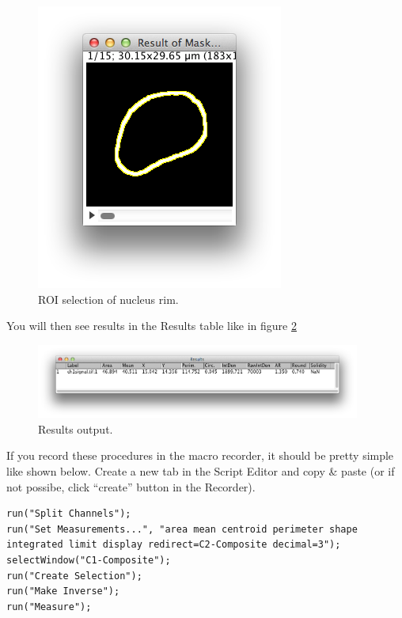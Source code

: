 \begin{figure}[h!]
\begin{center}
\includegraphics[scale=0.8]{fig/ROIselectionNucRim.png}
\caption{ROI selection of nucleus rim. }
\label{fig_RoiNucRim}
\end{center}
\end{figure}

You will then see results in the Results table like in figure \ref{fig_NucRimMeasureResults}

\begin{figure}[h!]
\begin{center}
\includegraphics[width=0.95\textwidth]{fig/MeasurementResults.png}
\caption{Results output.}
\label{fig_NucRimMeasureResults}
\end{center}
\end{figure}

If you record these procedures in the macro recorder, it should be pretty simple like shown below. Create a new tab in the Script Editor and copy \& paste (or if not possibe, click ``create'' button in the Recorder).

\begin{lstlisting}
run("Split Channels");
run("Set Measurements...", "area mean centroid perimeter shape integrated limit display redirect=C2-Composite decimal=3");
selectWindow("C1-Composite");
run("Create Selection");
run("Make Inverse");
run("Measure");
\end{lstlisting}

